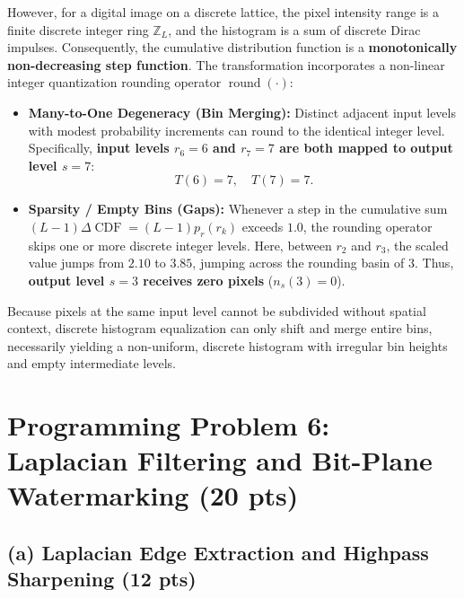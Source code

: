 \documentclass[11pt,a4paper]{article}
\begin{document}
However, for a digital image on a discrete lattice, the pixel intensity range is a finite discrete integer ring $\mathbb{Z}_L$, and the histogram is a sum of discrete Dirac impulses. Consequently, the cumulative distribution function is a \textbf{monotonically non-decreasing step function}. The transformation incorporates a non-linear integer quantization rounding operator $\operatorname{round}(\cdot)$:
\begin{itemize}
    \item \textbf{Many-to-One Degeneracy (Bin Merging):} Distinct adjacent input levels with modest probability increments can round to the identical integer level. Specifically, \textbf{input levels $r_6 = 6$ and $r_7 = 7$ are both mapped to output level $s = 7$}:
    \begin{equation}
    T(6) = 7, \quad T(7) = 7.
    \end{equation}
    \item \textbf{Sparsity / Empty Bins (Gaps):} Whenever a step in the cumulative sum $(L-1)\Delta \operatorname{CDF} = (L-1)p_r(r_k)$ exceeds $1.0$, the rounding operator skips one or more discrete integer levels. Here, between $r_2$ and $r_3$, the scaled value jumps from $2.10$ to $3.85$, jumping across the rounding basin of $3$. Thus, \textbf{output level $s = 3$ receives zero pixels} ($n_s(3) = 0$).
\end{itemize}
Because pixels at the same input level cannot be subdivided without spatial context, discrete histogram equalization can only shift and merge entire bins, necessarily yielding a non-uniform, discrete histogram with irregular bin heights and empty intermediate levels.

\section{Programming Problem 6: Laplacian Filtering and Bit-Plane Watermarking (20 pts)}

\subsection{(a) Laplacian Edge Extraction and Highpass Sharpening (12 pts)}
\end{document}
